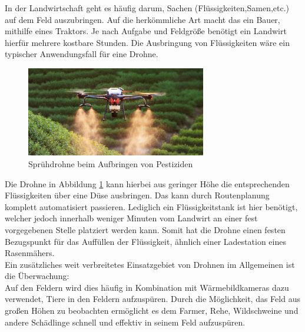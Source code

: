 In der Landwirtschaft geht es häufig darum, Sachen (Flüssigkeiten,Samen,etc.)
auf dem Feld auszubringen. Auf die herkömmliche Art macht das ein Bauer,
mithilfe eines Traktors. Je nach Aufgabe und Feldgröße benötigt ein Landwirt
hierfür mehrere kostbare Stunden. Die Ausbringung von Flüssigkeiten wäre ein
typischer Anwendungsfall für eine Drohne.

\begin{figure}[ht]
	\centering
	\includegraphics[width=0.7\textwidth]{bilder/drtohne.jpg}
	\caption[Sprühdrohne]{Sprühdrohne beim Aufbringen von Pestiziden \cite{Drohne}}
	\label{fig:sprühdrohne}
\end{figure}

Die Drohne in Abbildung \ref{fig:sprühdrohne} kann hierbei aus geringer Höhe
die entsprechenden Flüssigkeiten über eine Düse ausbringen. Das kann durch
Routenplanung komplett automatisiert passieren. Lediglich ein Flüssigkeitstank
ist hier benötigt, welcher jedoch innerhalb weniger Minuten vom Landwirt an
einer fest vorgegebenen Stelle platziert werden kann. Somit hat die Drohne
einen festen Bezugspunkt für das Auffüllen der Flüssigkeit, ähnlich einer
Ladestation eines Rasenmähers. \\ Ein zusätzliches weit verbreitetes
Einsatzgebiet von Drohnen im Allgemeinen ist die Überwachung: \\Auf den Feldern
wird dies häufig in Kombination mit Wärmebildkameras dazu verwendet, Tiere in
den Feldern aufzuspüren. Durch die Möglichkeit,
das Feld aus großen Höhen zu beobachten ermöglicht es dem Farmer, Rehe,
Wildschweine und andere Schädlinge schnell und effektiv in seinem Feld
aufzuspüren.
